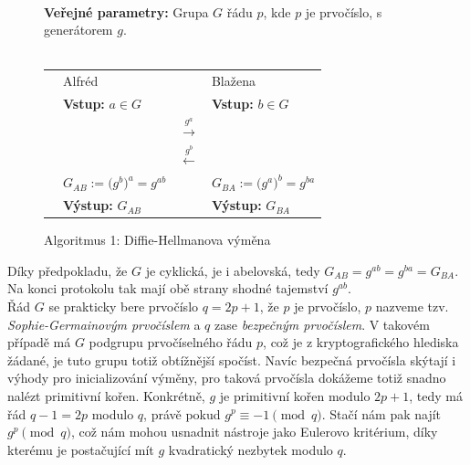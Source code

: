 \documentclass [12pt]{report}
\begin{document}
\begin{figure}
\begin{center} 
\makebox[1cm]{\rule{15cm}{0.4pt}}\\
\hspace{-1.35cm} \textbf{Veřejné parametry:} Grupa $G$ řádu $p$, kde $p$ je prvočíslo, s generátorem $g$.\\

\vspace{-0.25cm}
\makebox[\linewidth]{\rule{15cm}{0.4pt}}\\
\vspace{0.2cm}
\begin{tabular}{l l c l}
\cline{2-2} \cline{4-4} 
& Alfréd & & Blažena \\ 
\cline{2-2} \cline{4-4} 
& \textbf{Vstup:} $a \in G$ & & \textbf{Vstup:} $b \in G$ \\
 & & $\stackrel{g^a}{\longrightarrow} $ &  \\
&  & $\stackrel{g^b}{\longleftarrow} $ &  \\
& $G_{AB} := \big(g^b\big)^{a} = g^{ab}$ &  & $ G_{BA} := \big(g^a\big)^{b} = g^{ba}$ \\
& \textbf{Výstup:} $G_{AB}$ & & \textbf{Výstup:} $G_{BA}$
\end{tabular}
\caption*{Algoritmus 1: Diffie-Hellmanova výměna}
\vspace{-0.8cm}
\end{center}
\end{figure}

Díky předpokladu, že $G$ je cyklická, je i abelovská, tedy $G_{AB} = g^{ab} = g^{ba} = G_{BA}$. Na konci protokolu tak mají obě strany shodné tajemství $g^{ab}$.\\

Řád $G$ se prakticky bere prvočíslo $q = 2p+1$, že $p$ je prvočíslo, $p$ nazveme tzv. \textit{Sophie-Germainovým prvočíslem} a $q$ zase \textit{bezpečným prvočíslem}. V takovém případě má $G$ podgrupu prvočíselného řádu $p$, což je z kryptografického hlediska žádané, je tuto grupu totiž obtížnější spočíst. Navíc bezpečná prvočísla skýtají i výhody pro inicializování výměny, pro taková prvočísla dokážeme totiž snadno nalézt primitivní kořen. Konkrétně, $g$ je primitivní kořen modulo $2p+1$, tedy má řád $q-1 = 2p$ modulo $q$, právě pokud $g^{p} \equiv -1 \pmod{q}$. Stačí nám pak najít $g^{p} \pmod{q}$, což nám mohou usnadnit nástroje jako Eulerovo kritérium, díky kterému je postačující mít $g$ kvadratický nezbytek modulo $q$.\\
\end{document}
